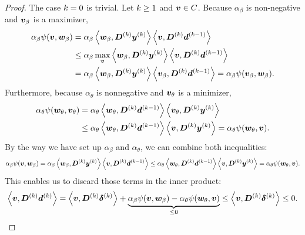 \documentclass{article}
\theoremstyle{plain}
\theoremstyle{definition}
\begin{document}
\begin{proof}
	The case $k=0$ is trivial.
	Let $k\geq1$ and $\bm{v} \in C$.
	Because $\alpha_\beta$ is non-negative and $\bm{v}_\beta$ is a 
	maximizer,
	\begin{align*}
	\alpha_\beta \psi(\bm{v}, \bm{w}_\beta)
	&=
	\alpha_\beta
	\left\langle \bm{w}_\beta, \bm{D}^{(k)} \bm{y}^{(k)} \right\rangle
	\left\langle \bm{v}, \bm{D}^{(k)} \bm{d}^{(k-1)} \right\rangle
	\\
	&\leq
	\alpha_\beta 
	\max_{\bm{v}}
	\left\langle \bm{w}_\beta, \bm{D}^{(k)} \bm{y}^{(k)} \right\rangle
	\left\langle \bm{v}, \bm{D}^{(k)} \bm{d}^{(k-1)} \right\rangle
	\\
	&=
	\alpha_\beta
	\left\langle \bm{w}_\beta, \bm{D}^{(k)} \bm{y}^{(k)} \right\rangle
	\left\langle \bm{v}_\beta, \bm{D}^{(k)} \bm{d}^{(k-1)} \right\rangle
	=
	\alpha_\beta \psi(\bm{v}_\beta, \bm{w}_\beta).
	\end{align*}
	Furthermore, because $\alpha_\theta$ is nonnegative
	and $\bm{v}_\theta$ is a minimizer,
	\begin{align*}
		\alpha_\theta \psi(\bm{w}_\theta, \bm{v}_\theta)
		&=
		\alpha_\theta
		\left\langle \bm{w}_\theta, \bm{D}^{(k)} \bm{d}^{(k-1)} \right\rangle
		\left\langle \bm{v}_\theta, \bm{D}^{(k)} \bm{y}^{(k)} \right\rangle
		\\
		&\leq
		\alpha_\theta
		\left\langle \bm{w}_\theta, \bm{D}^{(k)} \bm{d}^{(k-1)} \right\rangle
		\left\langle \bm{v}, \bm{D}^{(k)} \bm{y}^{(k)} \right\rangle
		=
		\alpha_\theta
		\psi(\bm{w}_\theta, \bm{v}).
	\end{align*}
	By the way we have set up $\alpha_\beta$ and $\alpha_\theta$,
	we can combine both inequalities:
	\begin{equation}
	\alpha_\beta \psi(\bm{v}, \bm{w}_\beta)
	=
	\alpha_\beta
		\left\langle \bm{w}_\beta, \bm{D}^{(k)} \bm{y}^{(k)} \right\rangle
		\left\langle \bm{v}, \bm{D}^{(k)} \bm{d}^{(k-1)} \right\rangle
	\leq
	\alpha_\theta
		\left\langle \bm{w}_\theta, \bm{D}^{(k)} \bm{d}^{(k-1)} \right\rangle
		\left\langle \bm{v}, \bm{D}^{(k)} \bm{y}^{(k)} \right\rangle
	=
	\alpha_\theta
	\psi(\bm{w}_\theta, \bm{v})
	.
	\label{eqn:porkpieRelevancies}
	\end{equation}
	This enables us to discard those terms in the inner product:
	$$
	\left\langle \bm{v}, \bm{D}^{(k)} \bm{d}^{(k)} \right\rangle
	=
	\left\langle \bm{v}, \bm{D}^{(k)} \bm{\delta}^{(k)} \right\rangle
	+ 
	\underbrace{
		\alpha_\beta
		\psi(\bm{v}, \bm{w}_\beta)
		-
		\alpha_\theta
		\psi(\bm{w}_\theta, \bm{v})
	}_{\leq 0}
	\leq
	\left\langle \bm{v}, \bm{D}^{(k)} \bm{\delta}^{(k)} \right\rangle
	\leq 0.
	$$

\end{proof}
\end{document}
